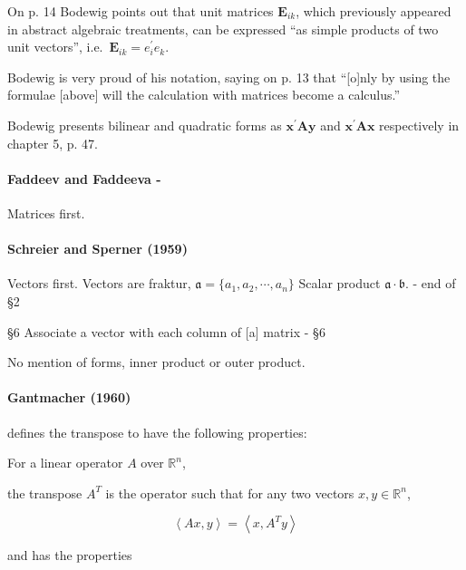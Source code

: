 On p. 14 Bodewig points out that unit matrices $\mathbf E_{ik}$, which previously
appeared in abstract algebraic treatments, can be expressed ``as simple products
of two unit vectors'', i.e.\ $\mathbf E_{ik} = e^\prime_i e_k$.

Bodewig is very proud of his notation, saying on p. 13 that
``[o]nly by using the formulae [above] will the calculation with matrices become a calculus.''

Bodewig presents bilinear and quadratic forms as $\mathbf{x^\prime A y}$ and
$\mathbf{x^\prime A x}$ respectively in chapter 5, p. 47.



\paragraph{Faddeev and Faddeeva - \cite{Faddeev1959}}

Matrices first.



\paragraph{Schreier and Sperner (1959)~\cite{Schreier1959}}

Vectors first.
Vectors are fraktur, $\mathfrak a = \{a_1, a_2, \cdots, a_n\}$
Scalar product $\mathfrak a \cdot \mathfrak b$. - end of \S 2

\S6 Associate a vector with each column of [a] matrix - \S 6

No mention of forms, inner product or outer product.




\paragraph{Gantmacher (1960)~\cite{Gantmacher1960}}

\cite[p. 280, Definition 10]{Gantmacher1960} defines the transpose to have the following properties:

For a linear operator $A$ over $\mathbb R^n$,

the transpose $A^T$ is the operator such that for any two vectors $x, y \in \mathbb R^n$,

\[
\left\langle Ax, y \right\rangle = \left\langle x, A^T y \right\rangle
\]

and has the properties


